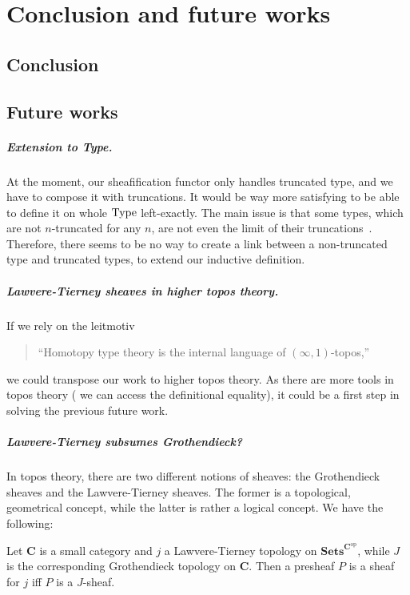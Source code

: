 \chapter{Conclusion and future works}
\label{chap:conclusion}

\section{Conclusion}
\section{Future works}

\paragraph*{Extension to Type.}
At the moment, our sheafification functor only handles truncated type,
and we have to compose it with truncations. It would be way more
satisfying to be able to define it on whole $\operatorname{Type}$ left-exactly. The
main issue is that some types, which are not $n$-truncated for any
$n$, are not even the limit of their
truncations~\cite{morelvv}. Therefore, there seems to be no way to
create a link between a non-truncated type and truncated types, to
extend our inductive definition. 

\paragraph*{Lawvere-Tierney sheaves in higher topos theory.}
If we rely on the leitmotiv
\begin{quote}
  ``Homotopy type theory is the internal language of $(\infty,1)$-topos,''
\end{quote}
we could transpose our work to higher topos theory. As there are more
tools in topos theory (\eg{} we can access the definitional equality),
it could be a first step in solving the previous future work.

\paragraph*{Lawvere-Tierney subsumes Grothendieck?}
In topos theory, there are two different notions of sheaves: the
Grothendieck sheaves and the Lawvere-Tierney sheaves.
The former is a topological, geometrical concept, while the latter is
rather a logical concept. 
We have the following:
\begin{thm}
  Let $\mathbf{C}$ is a small category and $j$ a Lawvere-Tierney
  topology on $\mathbf{Sets}^{\mathbf{C}^{\mathrm{op}}}$, while $J$ is
  the corresponding Grothendieck topology on $\mathbf{C}$. Then a
  presheaf $P$ is a sheaf for $j$ iff $P$ is a $J$-sheaf.
\end{thm}





